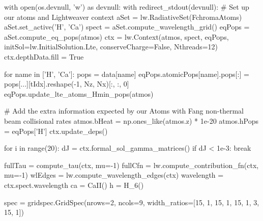 \begin{pycode}[2DRT]
    with open(os.devnull, 'w') as devnull:
        with redirect_stdout(devnull):
            # Set up our atoms and Lightweaver context
            aSet = lw.RadiativeSet(FchromaAtoms)
            aSet.set_active('H', 'Ca')
            spect = aSet.compute_wavelength_grid()
            eqPops = aSet.compute_eq_pops(atmos)
            ctx = lw.Context(atmos, spect, eqPops, initSol=lw.InitialSolution.Lte, conserveCharge=False,
                            Nthreads=12)
            ctx.depthData.fill = True

            for name in ['H', 'Ca']:
                pops = data[name]
                eqPops.atomicPops[name].pops[:] = pops[...][tIdx].reshape(-1, Nz, Nx)[:, :, 0]
            eqPops.update_lte_atoms_Hmin_pops(atmos)

            # Add the extra information expected by our Atoms with Fang non-thermal beam collisional rates
            atmos.bHeat = np.ones_like(atmos.z) * 1e-20
            atmos.hPops = eqPops['H']
            ctx.update_deps()

            for i in range(20):
                dJ = ctx.formal_sol_gamma_matrices()
                if dJ < 1e-3:
                    break

    fullTau = compute_tau(ctx, mu=-1)
    fullCfn = lw.compute_contribution_fn(ctx, mu=-1)
    wlEdges = lw.compute_wavelength_edges(ctx)
    wavelength = ctx.spect.wavelength
    ca = CaII()
    h = H_6()

    spec = gridspec.GridSpec(nrows=2, ncols=9, width_ratios=[15, 1, 15, 1, 15, 1, 3, 15, 1])


\end{pycode}
